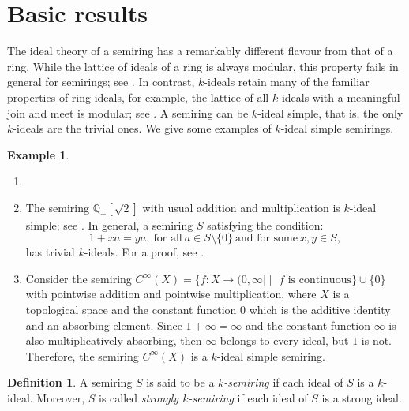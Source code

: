 \documentclass[11pt,leqno]{amsart}
\theoremstyle{definition}
\newtheorem{definition}[theorem]{Definition}
\newtheorem{example}[theorem]{Example}
\numberwithin{equation}{section}
\begin{document}
\section{Basic results}\label{Section 3: Some results on k-ideals on semirings}
 
The ideal theory of a semiring has a remarkably different flavour from that of a ring. While the lattice of ideals of a ring is always modular, this property fails in general for semirings; see \cite[Example 6.36]{Golan}. In contrast, $k$-ideals retain many of the familiar properties of ring ideals, for example, the lattice of all $k$-ideals with a meaningful join and meet is modular; see \cite[Theorem 2.4]{SenAdhikari92}. A semiring can be $k$-ideal simple, that is, the only $k$-ideals are the trivial ones. We give some examples of $k$-ideal simple semirings. 

\begin{example}
\begin{enumerate}
    \item[]
        \item The semiring $\mathds{Q}_+[\sqrt{2}]$ with usual addition and multiplication is $k$-ideal simple; see \cite[Section 5.2]{BiswasGoswamiSardar}. In general, a semiring $S$ satisfying the condition:
        \[
        1+xa=ya,\ \text{for all}\ a\in S\setminus\{0\}\ \text{and for some}\ x,y\in S,
        \] has trivial $k$-ideals. For a proof, see \cite[Corollary 2.8]{SenAdhikari93}.
        
        \item  Consider the semiring $C^\infty(X)=\{f\colon X\rightarrow (0, \infty]\mid $  $f$ $ \text{is continuous}\}\cup \{0\}$ with pointwise addition and pointwise multiplication, where $X$ is a topological space and the constant function $0$ which is the additive identity and an absorbing element.  Since $1+\infty=\infty$ and the constant function $\infty$ is also multiplicatively absorbing,  then $\infty$ belongs to every ideal, but $1$ is not. Therefore, the semiring $C^\infty(X)$ is a $k$-ideal simple semiring. 
    \end{enumerate}
\end{example}

\begin{definition}
    A semiring $S$ is said to be a \emph{$k$-semiring} if each ideal of $S$ is a $k$-ideal. Moreover, $S$ is called \emph{strongly $k$-semiring}  if each ideal of $S$ is a strong ideal. 
\end{definition}
\end{document}
